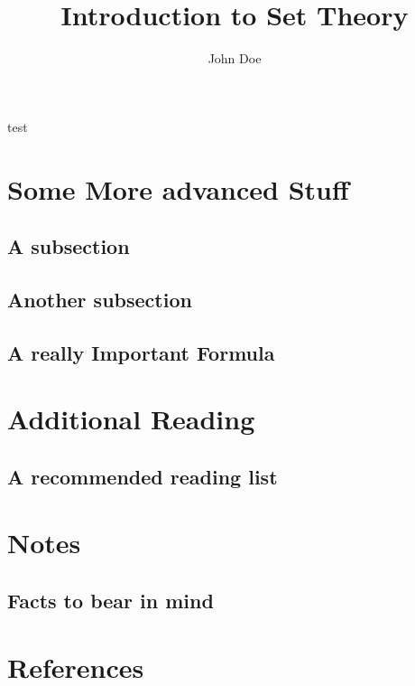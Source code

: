 \documentclass{beamer}
\title{Introduction to Set Theory}
\author{John Doe}
\begin{document}
\maketitle
\begin{frame}{test}

	\section{Some More advanced Stuff}
	\subsection{A subsection}
	\subsection{Another subsection}
	\subsection{A really Important Formula}
	\section{Additional Reading}
	\subsection{A recommended reading list}
	\section{Notes}
	\subsection{Facts to bear in mind}
	\section{References}
\end{frame}
\end{document}
